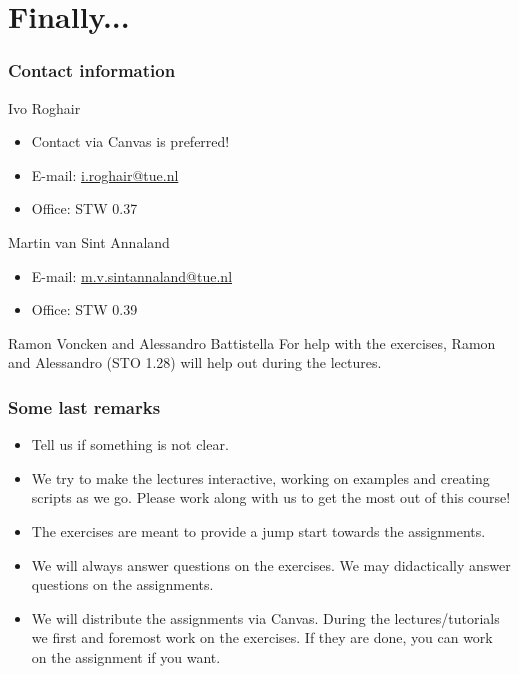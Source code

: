 \documentclass[11pt,table,final,fleqn,xcolor={usenames,dvipsnames},handout]{beamer}
\begin{document}
\section{Finally...}
\begin{frame}
 \frametitle{Contact information}
 \begin{block}{Ivo Roghair}
  \begin{itemize}
   \item Contact via Canvas is preferred!
   \item E-mail: \href{mailto:i.roghair@tue.nl}{i.roghair@tue.nl}
   \item Office: STW 0.37
   \end{itemize} 
 \end{block}
 \vspace{1em}
  \begin{block}{Martin van Sint Annaland}
  \begin{itemize}
   \item E-mail: \href{mailto:m.v.sintannaland@tue.nl}{m.v.sintannaland@tue.nl}
   \item Office: STW 0.39 
   \end{itemize} 
 \end{block}
 \begin{block}{Ramon Voncken and Alessandro Battistella}
    For help with the exercises, Ramon and Alessandro (STO 1.28) will help out during the lectures.\\
  \end{block}
\end{frame}

\begin{frame}
 \frametitle{Some last remarks}
  \begin{itemize}
   \item Tell us if something is not clear.
   \item We try to make the lectures interactive, working on examples and creating scripts as we go. Please work along with us to get the most out of this course!
   \item The exercises are meant to provide a jump start towards the assignments.
   \item We will always answer questions on the exercises. We may didactically answer questions on the assignments.
   \item We will distribute the assignments via Canvas. During the lectures/tutorials we first and foremost work on the exercises. If they are done, you can work on the assignment if you want.
   \end{itemize} 
\end{frame}
\end{document}
